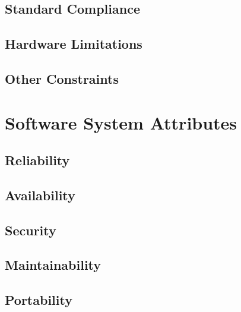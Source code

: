 \subsection{Standard Compliance}
\subsection{Hardware Limitations}
\subsection{Other Constraints}

\section{Software System Attributes}
\subsection{Reliability}
\subsection{Availability}
\subsection{Security}
\subsection{Maintainability}
\subsection{Portability}